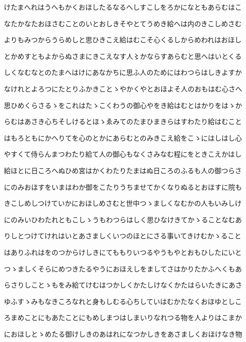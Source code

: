 \documentclass[a4paper,11pt,landscape]{ltjtarticle}
\begin{document}
\par\medskip
けたまへれはうへもかくおほしたるなるへしすこしをろかになともあらむはこ
\par\medskip
なたかなたおほさむことのいとおしきそやとてうめき給へは内のきこしめさむ
\par\medskip
よりもみつからうらめしと思ひきこえ給はむこそ心くるしからめわれはおほし
\par\medskip
とかめすともよからぬさまにきこえなす人〻かならすあらむと思へはいとくる
\par\medskip
しくなむなとのたまへはけにあなかちに思ふ人のためにはわつらはしきよすか
\par\medskip
なけれとよろつにたとりふかきことゝやかくやとおほよそ人のおもはむ心さへ
\par\medskip
思ひめくらさるゝをこれはたゝこくわうの御心やをき給はむとはかりをはゝか
\par\medskip
らむはあさき心ちそしけるとほゝゑみてのたまひまきらはすわたり給はむこと
\par\medskip
はもろともにかへりてを心のとかにあらむとのみきこえ給をこゝにはしはし心
\par\medskip
やすくて侍らんまつわたり給て人の御心もなくさみなむ程にをときこえかはし
\par\medskip
給ほとに日ころへぬひめ宮はかくわたりたまはぬ日ころのふるも人の御つらさ
\par\medskip
にのみおほすをいまはわか御をこたりうちませてかくなりぬるとおほすに院も
\par\medskip
きこしめしつけていかにおほしめさむと世中つゝましくなむかの人もいみしけ
\par\medskip
にのみいひわたれともこしゝうもわつらはしく思ひなけきてかゝることなむあ
\par\medskip
りしとつけてけれはいとあさましくいつのほとにさる事いてきけむかゝること
\par\medskip
はありふれはをのつからけしきにてももりいつるやうもやとおもひしたにいと
\par\medskip
つゝましくそらにめつきたるやうにおほえしをましてさはかりたかふへくもあ
\par\medskip
らさりしことゝもをみ給てけむはつかしくかたしけなくかたはらいたきにあさ
\par\medskip
ゆふすゝみもなきころなれと身もしむる心ちしていはむかたなくおほゆとしこ
\par\medskip
ろまめことにもあたことにもめしまつはしまいりなれつる物を人よりはこまか
\par\medskip
におほしとゝめたる御けしきのあはれになつかしきをあさましくおほけなき物
\end{document}
